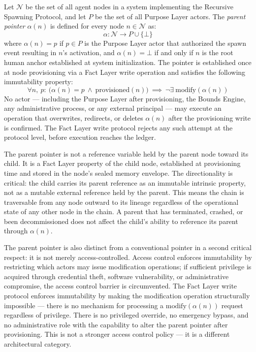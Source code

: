 \begin{dfn}\label{dfn:parent-pointer}
Let $\mathcal{N}$ be the set of all agent nodes in a \bxthree{} system implementing the Recursive Spawning Protocol, and let $P$ be the set of all Purpose Layer actors. The \emph{parent pointer} $\alpha(n)$ is defined for every node $n \in \mathcal{N}$ as:
\begin{equation}
\alpha : \mathcal{N} \rightarrow P \cup \{\bot\}
\end{equation}
where $\alpha(n) = p$ if $p \in P$ is the Purpose Layer actor that authorized the spawn event resulting in $n$'s activation, and $\alpha(n) = \bot$ if and only if $n$ is the root human anchor established at system initialization. The pointer is established once at node provisioning via a Fact Layer write operation and satisfies the following immutability property:
\begin{equation}
\forall n,\ p:\ \bigl(\alpha(n) = p \ \land \ \text{provisioned}(n)\bigr) \ \implies \ \neg\exists\ \text{modify}(\alpha(n))
\label{eq:parent-pointer-immutability}
\end{equation}
No actor — including the Purpose Layer after provisioning, the Bounds Engine, any administrative process, or any external principal — may execute an operation that overwrites, redirects, or deletes $\alpha(n)$ after the provisioning write is confirmed. The Fact Layer write protocol rejects any such attempt at the protocol level, before execution reaches the ledger.
\end{dfn}

The parent pointer is not a reference variable held by the parent node toward its child. It is a Fact Layer property of the child node, established at provisioning time and stored in the node's sealed memory envelope. The directionality is critical: the child carries its parent reference as an immutable intrinsic property, not as a mutable external reference held by the parent. This means the chain is traversable from any node outward to its lineage regardless of the operational state of any other node in the chain. A parent that has terminated, crashed, or been decommissioned does not affect the child's ability to reference its parent through $\alpha(n)$.

The parent pointer is also distinct from a conventional pointer in a second critical respect: it is not merely access-controlled. Access control enforces immutability by restricting which actors may issue modification operations; if sufficient privilege is acquired through credential theft, software vulnerability, or administrative compromise, the access control barrier is circumvented. The Fact Layer write protocol enforces immutability by making the modification operation structurally impossible — there is no mechanism for processing a $\text{modify}(\alpha(n))$ request regardless of privilege. There is no privileged override, no emergency bypass, and no administrative role with the capability to alter the parent pointer after provisioning. This is not a stronger access control policy — it is a different architectural category.

